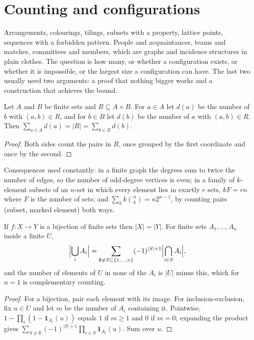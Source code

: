 \section{Counting and configurations}

\begin{recognise}
Arrangements, colourings, tilings, subsets with a property, lattice points, sequences with a forbidden pattern. People and acquaintances, teams and matches, committees and members, which are graphs and incidence structures in plain clothes. The question is how many, or whether a configuration exists, or whether it is impossible, or the largest size a configuration can have. The last two usually need two arguments: a proof that nothing bigger works and a construction that achieves the bound.
\end{recognise}

\begin{theorem}
Let $A$ and $B$ be finite sets and $R\subseteq A\times B$. For $a\in A$ let $d(a)$ be the number of $b$ with $(a,b)\in R$, and for $b\in B$ let $d(b)$ be the number of $a$ with $(a,b)\in R$. Then $\sum_{a\in A}d(a)=|R|=\sum_{b\in B}d(b)$.
\end{theorem}

\begin{proof}
Both sides count the pairs in $R$, once grouped by the first coordinate and once by the second.
\end{proof}

Consequences used constantly: in a finite graph the degrees sum to twice the number of edges, so the number of odd-degree vertices is even; in a family of $k$-element subsets of an $n$-set in which every element lies in exactly $r$ sets, $kF=rn$ where $F$ is the number of sets; and $\sum_k k\binom nk=n2^{n-1}$, by counting pairs (subset, marked element) both ways.

\begin{theorem}
If $f\colon X\to Y$ is a bijection of finite sets then $|X|=|Y|$. For finite sets $A_1,\dots,A_n$ inside a finite $U$,
\[
\Bigl|\bigcup_iA_i\Bigr|=\sum_{\emptyset\ne S\subseteq\{1,\dots,n\}}(-1)^{|S|+1}\Bigl|\bigcap_{i\in S}A_i\Bigr|,
\]
and the number of elements of $U$ in none of the $A_i$ is $|U|$ minus this, which for $n=1$ is complementary counting.
\end{theorem}

\begin{proof}
For a bijection, pair each element with its image. For inclusion-exclusion, fix $u\in U$ and let $m$ be the number of $A_i$ containing it. Pointwise, $1-\prod_i(1-\mathbf 1_{A_i}(u))$ equals $1$ if $m\ge 1$ and $0$ if $m=0$; expanding the product gives $\sum_{S\ne\emptyset}(-1)^{|S|+1}\prod_{i\in S}\mathbf 1_{A_i}(u)$. Sum over $u$.
\end{proof}

